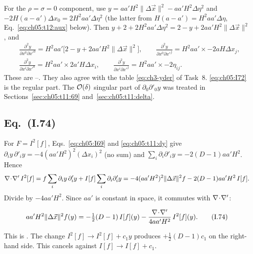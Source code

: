 For the $\rho=\sigma=0$ component, use $y=aa'H^2\|\Delta\vec x\|^2-aa'H^2\Delta\eta^2$ and $-2H(a-a')\Delta x_0=2H^2aa'\Delta\eta^2$
(the latter from $H(a-a')=H^2aa'\Delta\eta$, Eq.~\eqref{eq:ch05:t12:aux} below). Then $y+2+2H^2aa'\Delta\eta^2=2-y+2aa'H^2\|\Delta\vec x\|^2$, and
\begin{equation}
\begin{aligned}
&\frac{\partial^2y}{\partial x^0\partial x'^0}=H^2aa'\big[2-y+2aa'H^2\|\Delta\vec x\|^2\big],\qquad
\frac{\partial^2y}{\partial x^0\partial x'^j}=H^2aa'\times-2aH\Delta x_j,\\
&\frac{\partial^2y}{\partial x^i\partial x'^0}=H^2aa'\times2a'H\Delta x_i,\qquad
\frac{\partial^2y}{\partial x^i\partial x'^j}=H^2aa'\times-2\eta_{ij}.
\end{aligned}
\tag{I.72--73}\label{eq:ch05:I72}
\end{equation}
These are --. They also agree with the table \eqref{eq:ch3-yder} of Task~8.
\eqref{eq:ch05:I72} is the regular part. The $\mathcal{O}\!\left(\delta\right)$ singular part of $\partial_0\partial'_0y$ was treated in Sections~\ref{sec:ch05:t11:69} and~\ref{sec:ch05:t11:delta}.

\subsection[Eq. (I.74)]{Eq.~(I.74) \tD}

For $F=I^2[f]$, Eqs.~\eqref{eq:ch05:I69} and \eqref{eq:ch05:t11:dy} give $\partial_iy\,\partial'_iy=-4(aa'H^2)^2(\Delta x_i)^2$ (no sum) and $\sum_i\partial_i\partial'_iy=-2(D-1)aa'H^2$. Hence
\begin{equation*}
\nabla\!\cdot\!\nabla'\,I^2[f]=f\sum_i\partial_iy\,\partial'_iy+I[f]\sum_i\partial_i\partial'_iy=-4(aa'H^2)^2\|\Delta\vec x\|^2f-2(D-1)aa'H^2\,I[f].
\end{equation*}
Divide by $-4aa'H^2$. Since $aa'$ is constant in space, it commutes with $\nabla\!\cdot\!\nabla'$:
\begin{resultbox}
\begin{equation}
aa'H^2\|\Delta\vec x\|^2f(y)=-\tfrac12(D-1)\,I[f](y)-\frac{\nabla\!\cdot\!\nabla'}{4aa'H^2}\,I^2[f](y).
\tag{I.74}\label{eq:ch05:I74}
\end{equation}
\end{resultbox}
\noindent This is . The change $I^2[f]\to I^2[f]+c_1y$ produces $+\frac12(D-1)c_1$ on the right-hand side. This cancels against $I[f]\to I[f]+c_1$.

